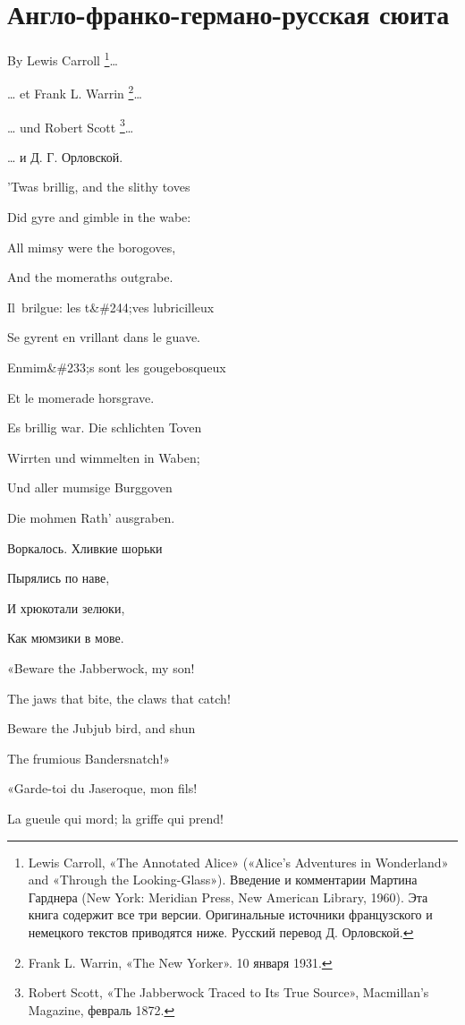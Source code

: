 \documentclass[../main.tex]{subfiles}
\begin{document}
\section{Англо-франко-германо-русская сюита}

By Lewis Carroll \footnote{Lewis Carroll, «The Annotated Alice» («Alice's Adventures in Wonderland» and «Through the Looking-Glass»). Введение и комментарии Мартина Гарднера (New York: Meridian Press, New American Library, 1960). Эта книга содержит все три версии. Оригинальные источники французского и немецкого текстов приводятся ниже. Русский перевод Д. Орловской.}\ldots{}

\ldots{} et Frank L. Warrin \footnote{Frank L. Warrin, «The New Yorker». 10 января 1931.}\ldots{}

\ldots{} und Robert Scott \footnote{Robert Scott, «The Jabberwock Traced to Its True Source», Macmillan's Magazine, февраль 1872.}\ldots{}

\ldots{} и Д. Г. Орловской.

'Twas brillig, and the slithy toves

Did gyre and gimble in the wabe:

All mimsy were the borogoves,

And the momeraths outgrabe.

Il~brilgue: les t\&\#244;ves lubricilleux

Se gyrent en vrillant dans le guave.

Enmim\&\#233;s sont les gougebosqueux

Et le momerade horsgrave.

Es brillig war. Die schlichten Toven

Wirrten und wimmelten in Waben;

Und aller mumsige Burggoven

Die mohmen Rath' ausgraben.

Воркалось. Хливкие шорьки

Пырялись по наве,

И хрюкотали зелюки,

Как мюмзики в мове.

«Beware the Jabberwock, my son!

The jaws that bite, the claws that catch!

Beware the Jubjub bird, and shun

The frumious Bandersnatch!»

«Garde-toi du Jaseroque, mon fils!

La gueule qui mord; la griffe qui prend!
\end{document}
